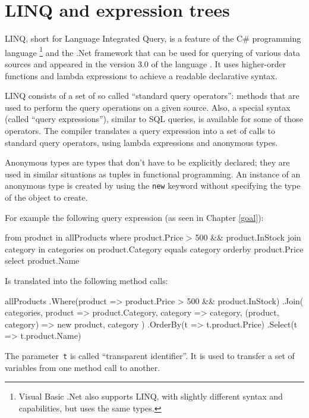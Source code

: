 \section{LINQ and expression trees}

LINQ, short for Language Integrated Query, is a feature of the C\# programming language%
\footnote{Visual Basic .Net also supports LINQ, with slightly different syntax
and capabilities, but uses the same types.}
and the .Net framework that can be used for querying of various data sources
and appeared in the version 3.0 of the language \cite{cs-in-depth}.
It uses higher-order functions and lambda expressions to achieve a readable declarative syntax.

LINQ consists of a set of so called “standard query operators”:
methods that are used to perform the query operations on a given source.
Also, a special syntax (called “query expressions”), similar to SQL queries, is available
for some of those operators.
The compiler translates a query expression into a set of calls to standard query operators,
using lambda expressions and anonymous types.

Anonymous types are types that don't have to be explicitly declared;
they are used in similar situations as tuples in functional programming.
An instance of an anonymous type is created by using the \lstinline{new} keyword
without specifying the type of the object to create.

For example the following query expression (as seen in Chapter \ref{goal}):

\nopagebreak

\begin{code}
from product in allProducts
where product.Price > 500
   && product.InStock
join category in categories on product.Category equals category
orderby product.Price
select product.Name
\end{code}

Is translated into the following method calls:

\begin{code}
allProducts
    .Where(product => product.Price > 500 && product.InStock)
    .Join(
        categories,
        product => product.Category,
        category => category,
        (product, category) => new { product, category })
    .OrderBy(t => t.product.Price)
    .Select(t => t.product.Name)
\end{code}

The parameter~\lstinline,t, is called “transparent identifier”. It is used to transfer a set of variables from one method call to another.

